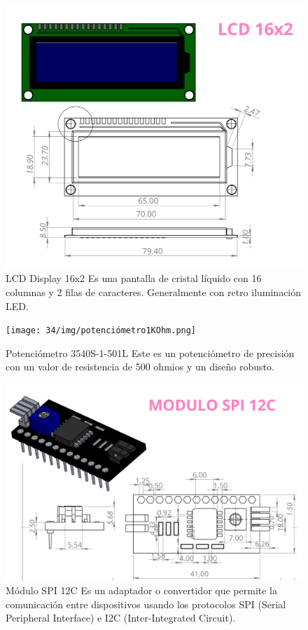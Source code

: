     
    \begin{figure}[H]
        \centering
        \includegraphics[scale=0.3]{34/img/lcd16x2.png}
        \caption{LCD Display 16x2 Es una pantalla de cristal líquido con 16 columnas y 2 filas de caracteres. Generalmente con retro iluminación LED.}
        \label{lcd16x2}
    \end{figure}
    
    \begin{figure}[H]
        \centering
        \texttt{[image: 34/img/potenciómetro1KOhm.png]}
        \caption{Potenciómetro 3540S-1-501L Este es un potenciómetro de precisión con un valor de resistencia
    de 500 ohmios y un diseño robusto.}
        \label{potenciómetro1KOhm}
    \end{figure}
    
    \begin{figure}[H]
        \centering
        \includegraphics[scale=0.3]{34/img/móduloSpi.png}
        \caption{Módulo SPI 12C Es un adaptador o convertidor
    que permite la comunicación entre dispositivos usando los protocolos SPI (Serial Peripheral Interface) e I2C (Inter-Integrated Circuit).}
        \label{móduloSpi}
    \end{figure}
    
